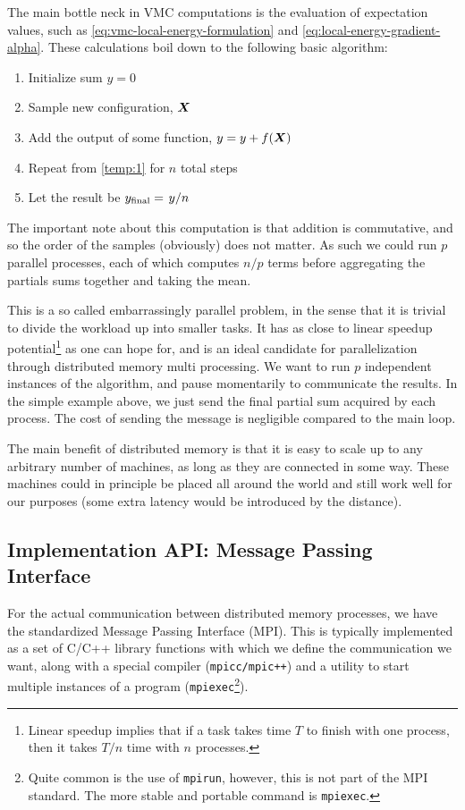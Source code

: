 \documentclass[Thesis.tex]{subfiles}
\begin{document}
The main bottle neck in VMC computations is the evaluation of expectation
values, such as \cref{eq:vmc-local-energy-formulation} and
\cref{eq:local-energy-gradient-alpha}. These calculations boil down to the
following basic algorithm:

\begin{enumerate}
\item Initialize sum $y = 0$
\item Sample new configuration, $\bm{X}$\label{temp:1}
\item Add the output of some function, $y = y + f(\bm{X})$
\item Repeat from \ref{temp:1} for $n$ total steps
\item Let the result be $y_\text{final} = \flatfrac{y}{n}$
\end{enumerate}
The important note about this computation is that addition is commutative, and
so the order of the samples (obviously) does not matter. As such we could run
$p$ parallel processes, each of which computes $n / p$ terms before aggregating
the partials sums together and taking the mean.

This is a so called embarrassingly parallel problem, in the sense that it is
trivial to divide the workload up into smaller tasks. It has as close to linear
speedup potential\footnote{Linear speedup implies that if a task takes time $T$
to finish with one process, then it takes $T/n$ time with $n$ processes.} as one
can hope for, and is an ideal candidate for parallelization through distributed
memory multi processing. We want to run $p$ independent instances of the
algorithm, and pause momentarily to communicate the results. In the simple
example above, we just send the final partial sum acquired by each process. The
cost of sending the message is negligible compared to the main loop.

The main benefit of distributed memory is that it is easy to scale up to any
arbitrary number of machines, as long as they are connected in some way. These
machines could in principle be placed all around the world and still work well
for our purposes (some extra latency would be introduced by the distance).

\subsection{Implementation API: Message Passing Interface}

For the actual communication between distributed memory processes, we have the
standardized Message Passing Interface (MPI). This is typically implemented as a
set of C/C++ library functions with which we define the communication we want,
along with a special compiler (\texttt{mpicc/mpic++}) and a utility to start
multiple instances of a program (\texttt{mpiexec}\footnote{Quite common is the
  use of \texttt{mpirun}, however, this is not part of the MPI standard. The
  more stable and portable command is \texttt{mpiexec}.}).
\end{document}
